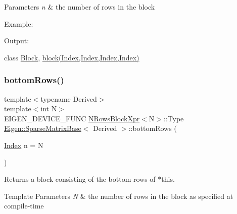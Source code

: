 \begin{DoxyParams}{Parameters}
{\em n} & the number of rows in the block\\
\hline
\end{DoxyParams}
Example\+: 
\begin{DoxyCodeInclude}{0}
\end{DoxyCodeInclude}
 Output\+: 
\begin{DoxyVerbInclude}
\end{DoxyVerbInclude}
 class \mbox{\hyperlink{class_eigen_1_1_block}{Block}}, \mbox{\hyperlink{class_eigen_1_1_sparse_matrix_base_a7c28a2f511181c727396d5e813519d38}{block(\+Index,\+Index,\+Index,\+Index)}} \mbox{\label{class_eigen_1_1_sparse_matrix_base_ab650ae58b1b3d03df6ebc0226388e0b9}} 
\subsubsection{\texorpdfstring{bottomRows()}{bottomRows()}\hspace{0.1cm}{\footnotesize\ttfamily [2/2]}}
{\footnotesize\ttfamily template$<$typename Derived$>$ \\
template$<$int N$>$ \\
E\+I\+G\+E\+N\+\_\+\+D\+E\+V\+I\+C\+E\+\_\+\+F\+U\+NC \mbox{\hyperlink{struct_eigen_1_1_sparse_matrix_base_1_1_n_rows_block_xpr}{N\+Rows\+Block\+Xpr}}$<$N$>$\+::Type \mbox{\hyperlink{class_eigen_1_1_sparse_matrix_base}{Eigen\+::\+Sparse\+Matrix\+Base}}$<$ Derived $>$\+::bottom\+Rows (\begin{DoxyParamCaption}\item[{\mbox{\hyperlink{struct_eigen_1_1_eigen_base_a554f30542cc2316add4b1ea0a492ff02}{Index}}}]{n = {\ttfamily N} }\end{DoxyParamCaption})\hspace{0.3cm}{\ttfamily [inline]}}

\begin{DoxyReturn}{Returns}
a block consisting of the bottom rows of $\ast$this.
\end{DoxyReturn}

\begin{DoxyTemplParams}{Template Parameters}
{\em N} & the number of rows in the block as specified at compile-\/time \\
\hline
\end{DoxyTemplParams}

